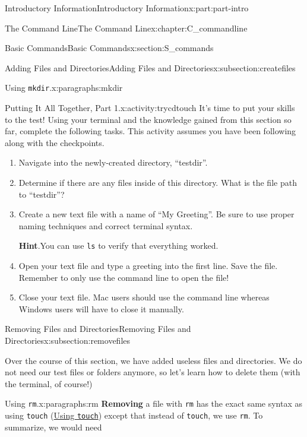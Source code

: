 \documentclass[oneside,10pt,]{book}
\newcommand{\blocktitlefont}{\relax}
\newcommand{\mono}[1]{\texttt{#1}}
\newcommand{\terminology}[1]{\textbf{#1}}
\begin{document}
\begin{partptx}{Introductory Information}{}{Introductory Information}{}{}{x:part:part-intro}
\begin{chapterptx}{The Command Line}{}{The Command Line}{}{}{x:chapter:C_commandline}
\begin{sectionptx}{Basic Commands}{}{Basic Commands}{}{}{x:section:S_commands}
\begin{subsectionptx}{Adding Files and Directories}{}{Adding Files and Directories}{}{}{x:subsection:createfiles}
\begin{paragraphs}{Using \mono{mkdir}.}{x:paragraphs:mkdir}
\end{paragraphs}%
\begin{activity}{Putting It All Together, Part 1.}{x:activity:trycdtouch}%
%
It's time to put your skills to the test! Using your terminal and the knowledge gained from this section so far, complete the following tasks. This activity assumes you have been following along with the checkpoints.%
\begin{enumerate}[font=\bfseries,label=(\alph*),ref=\alph*]
\item{}Navigate into the newly-created directory, ``testdir''.%
\item{}Determine if there are any files inside of this directory. What is the file path to ``testdir''?%
\item{}Create a new text file with a name of ``My Greeting''. Be sure to use proper naming techniques and correct terminal syntax.%
\par\smallskip%
\noindent\textbf{\blocktitlefont Hint}.\hypertarget{g:hint:idp615506712}{}\quad{}You can use \mono{ls} to verify that everything worked.%
\item{}Open your text file and type a greeting into the first line. Save the file. Remember to only use the command line to open the file!%
\item{}Close your text file. Mac users should use the command line whereas Windows users will have to close it manually.%
\end{enumerate}
\end{activity}%
\end{subsectionptx}
%
%
\typeout{************************************************}
\typeout{************************************************}
%
\begin{subsectionptx}{Removing Files and Directories}{}{Removing Files and Directories}{}{}{x:subsection:removefiles}
%
\begin{introduction}{}%
Over the course of this section, we have added useless files and directories. We do not need our test files or folders anymore, so let's learn how to delete them (with the terminal, of course!)%
\end{introduction}%
\begin{paragraphs}{Using \mono{rm}.}{x:paragraphs:rm}%
\index{\mono{rm}}%
%
\index{command line!\mono{rm}}%
\terminology{Removing} a file with \mono{rm} has the exact same syntax as using \mono{touch} (\hyperlink{x:paragraphs:touch}{Using \mono{touch}}) except that instead of \mono{touch}, we use \mono{rm}. To summarize, we would need%

\end{paragraphs}
\end{subsectionptx}
\end{sectionptx}
\end{chapterptx}
\end{partptx}
\end{document}

